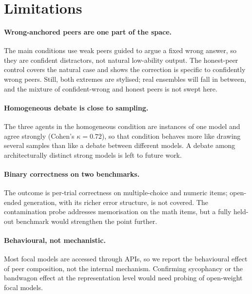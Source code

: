 \documentclass[11pt]{article}
\begin{document}
\section*{Limitations}
\label{sec:limitations}

\paragraph{Wrong-anchored peers are one part of the space.}
The main conditions use weak peers guided to argue a fixed wrong answer, so
they are confident distractors, not natural low-ability output.
The honest-peer control covers the natural case and shows the correction is
specific to confidently wrong peers.
Still, both extremes are stylised; real ensembles will fall in between, and
the mixture of confident-wrong and honest peers is not swept here.

\paragraph{Homogeneous debate is close to sampling.}
The three agents in the homogeneous condition are instances of one model
and agree strongly (Cohen's $\kappa = 0.72$), so that condition behaves more
like drawing several samples than like a debate between different models.
A debate among architecturally distinct strong models is left to future
work.

\paragraph{Binary correctness on two benchmarks.}
The outcome is per-trial correctness on multiple-choice and numeric items;
open-ended generation, with its richer error structure, is not covered.
The contamination probe addresses memorisation on the math items, but a
fully held-out benchmark would strengthen the point further.

\paragraph{Behavioural, not mechanistic.}
Most focal models are accessed through APIs, so we report the behavioural
effect of peer composition, not the internal mechanism.
Confirming sycophancy or the bandwagon effect at the representation level
would need probing of open-weight focal models.

\end{document}
